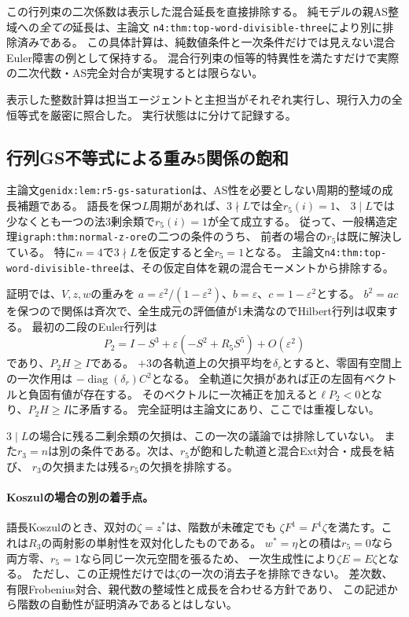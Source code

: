 \documentclass[11pt,a4paper]{ltjsarticle}
\begin{document}
この行列束の二次係数は表示した混合延長を直接排除する。
純モデルの親AS整域への\emph{全ての}延長は、主論文
\texttt{n4:thm:top-word-divisible-three}により別に排除済みである。
この具体計算は、純数値条件と一次条件だけでは見えない混合Euler障害の例として保持する。
混合行列束の恒等的特異性を満たすだけで実際の二次代数・AS完全対合が実現するとは限らない。

表示した整数計算は担当エージェントと主担当がそれぞれ実行し、現行入力の全恒等式を厳密に照合した。
実行状態はに分けて記録する。

\subsection{行列GS不等式による重み5関係の飽和}
\label{note:r5-gs-saturation}
主論文\texttt{genidx:lem:r5-gs-saturation}は、AS性を必要としない周期的整域の成長補題である。
語長を保つ$L$周期があれば、$3\nmid L$では全$r_5(i)=1$、
$3\mid L$では少なくとも一つの法3剰余類で$r_5(i)=1$が全て成立する。
従って、一般構造定理\texttt{igraph:thm:normal-z-ore}の二つの条件のうち、
前者の場合の$r_5$は既に解決している。
特に$n=4$で$3\nmid L$を仮定すると全$r_5=1$となる。
主論文\texttt{n4:thm:top-word-divisible-three}は、その仮定自体を親の混合モーメントから排除する。

証明では、$V,z,w$の重みを
$a=\varepsilon^2/(1-\varepsilon^2)$、$b=\varepsilon$、$c=1-\varepsilon^2$とする。
$b^2=ac$を保つので関係は斉次で、全生成元の評価値が1未満なのでHilbert行列は収束する。
最初の二段のEuler行列は
\[
P_2=I-S^3+\varepsilon(-S^2+R_5S^5)+O(\varepsilon^2)
\]
であり、$P_2H\ge I$である。
$+3$の各軌道上の欠損平均を$\delta_r$とすると、零固有空間上の一次作用は
$-\operatorname{diag}(\delta_r)C^2$となる。
全軌道に欠損があれば正の左固有ベクトルと負固有値が存在する。
そのベクトルに一次補正を加えると$\ell P_2<0$となり、$P_2H\ge I$に矛盾する。
完全証明は主論文にあり、ここでは重複しない。

$3\mid L$の場合に残る二剰余類の欠損は、この一次の議論では排除していない。
また$r_3=n$は別の条件である。次は、$r_5$が飽和した軌道と混合Ext対合・成長を結び、
$r_3$の欠損または残る$r_5$の欠損を排除する。

\paragraph{Koszulの場合の別の着手点。}
語長Koszulのとき、双対の$\zeta=z^*$は、階数が未確定でも
$\zeta F^1=F^1\zeta$を満たす。これは$R_3$の両射影の単射性を双対化したものである。
$w^*=\eta$との積は$r_5=0$なら両方零、$r_5=1$なら同じ一次元空間を張るため、
一次生成性により$\zeta E=E\zeta$となる。
ただし、この正規性だけでは$\zeta$の一次の消去子を排除できない。
差次数、有限Frobenius対合、親代数の整域性と成長を合わせる方針であり、
この記述から階数の自動性が証明済みであるとはしない。
\end{document}
